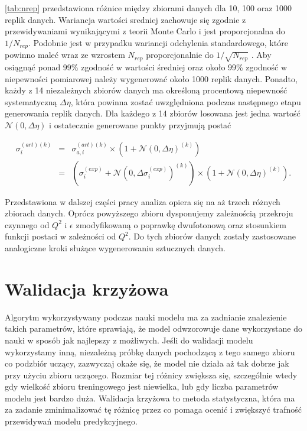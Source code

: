 \documentclass[11pt]{book}
\theoremstyle{definition}
\begin{document}
\tablename{} \ref{tab:nrep} przedstawiona różnice między zbiorami danych dla 10, 100 oraz 1000 replik danych. Wariancja wartości sredniej zachowuje się zgodnie z przewidywaniami wynikającymi z teorii Monte Carlo i jest proporcjonalna do $1/N_{rep}$. Podobnie jest w przypadku wariancji odchylenia standardowego, które powinno maleć wraz ze wzrostem $N_{rep}$ proporcjonalnie do $1/\sqrt{N_{rep}}$ \cite{2002JHEP...05..062F}. Aby osiągnąć ponad 99\% zgodność w wartości średniej oraz około 99\% zgodność w niepewności pomiarowej należy wygenerować około 1000 replik danych.
%
Ponadto, każdy z 14 niezależnych zbiorów danych ma określoną procentową niepewność systematyczną $\Delta\eta$, która powinna zostać uwzględniona podczas następnego etapu generowania replik danych. Dla każdego z 14 zbiorów losowana jest jedna wartość $\mathcal{N}\left( 0, \Delta \eta \right)$ i ostatecznie generowane punkty przyjmują postać

\begin{eqnarray}
\sigma^{(art)(k)}_{i}  &=& \sigma^{(art)(k)}_{a,i} \times \left( 1  + \mathcal{N}\left( 0, \Delta \eta \right)^{(k)} \right) \nonumber\\
&=& \left(\sigma_i^{(exp)} + \mathcal{N}\left( 0, \Delta \sigma_i^{(exp)} \right)^{(k)}\right) \times \left( 1  + \mathcal{N}\left( 0, \Delta \eta \right)^{(k)} \right).
\end{eqnarray}

Przedstawiona w dalszej części pracy analiza opiera się na aż trzech różnych zbiorach danych. Oprócz powyższego zbioru dysponujemy zależnością przekroju czynnego od $Q^2$ i $\epsilon$ zmodyfikowaną o poprawkę dwufotonową oraz stosunkiem funkcji postaci w zależności od $Q^2$. Do tych zbiorów danych zostały zastosowane analogiczne kroki służące wygenerowaniu sztucznych danych.


\section{Walidacja krzyżowa}

Algorytm wykorzystywany podczas nauki modelu ma za zadnianie znalezienie takich parametrów, które sprawiają, że model odwzorowuje dane wykorzystane do nauki w sposób jak najlepszy z możliwych. Jeśli do walidacji modelu wykorzystamy inną, niezależną próbkę danych pochodzącą z tego samego zbioru co podzbiór uczący, zazwyczaj okaże się, że model nie działa aż tak dobrze jak przy użyciu zbioru uczącego. Rozmiar tej różnicy zwiększa się, szczególnie wtedy gdy wielkość zbioru treningowego jest niewielka, lub gdy liczba parametrów modelu jest bardzo duża.
Walidacja krzyżowa to metoda statystyczna, która ma za zadanie zminimalizować tę różnicę przez co pomaga ocenić i zwiększyć trafność przewidywań modelu predykcyjnego. 
\end{document}
